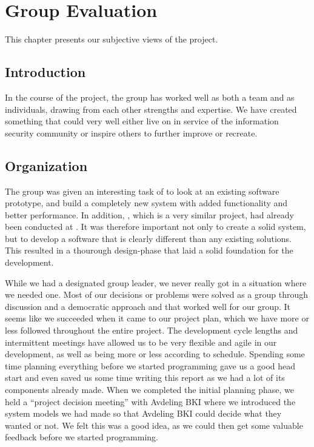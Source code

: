 \chapter{Group Evaluation}
This chapter presents our subjective views of the project.

\section{Introduction}
In the course of the project, the group has worked well as both a team and as
individuals, drawing from each other strengths and expertise. We have created
something that could very well either live on in service of the information
security community or inspire others to further improve or recreate.

\section{Organization}
The group was given an interesting task of to look at an existing software
prototype, and build a completely new system with added functionality and better
performance. In addition, \snortmanager{}, which is a very similar project, had
already been conducted at \GUC{}. It was therefore important not only to create
a solid system, but to develop a software that is clearly different than any
existing solutions. This resulted in a thourough design-phase that laid a solid
foundation for the development.

While we had a designated group leader, we never really got in a situation where
we needed one. Most of our decisions or problems were solved as a group through
discussion and a democratic approach and that worked well for our group. It
seems like we succeeded when it came to our project plan, which we have more or
less followed throughout the entire project. The development cycle lengths and
intermittent meetings have allowed us to be very flexible and agile in our
development, as well as being more or less according to schedule. Spending some
time planning everything before we started programming gave us a good head start
and even saved us some time writing this report as we had a lot of its
components already made. When we completed the initial planning phase, we held a
``project decision meeting'' with Avdeling BKI where we introduced the system
models we had made so that Avdeling BKI could decide what they wanted or not. We
felt this was a good idea, as we could then get some valuable feedback before we
started programming.


